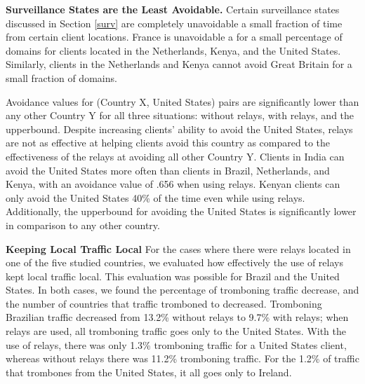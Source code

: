 {\bf Surveillance States are the Least Avoidable.}
Certain surveillance states discussed in Section \ref{surv} are completely unavoidable a small fraction of time from certain client locations.  France is unavoidable a for a small percentage of domains for clients located in the Netherlands, Kenya, and the United States.  Similarly, clients in the Netherlands and Kenya cannot avoid Great Britain for a small fraction of domains.  

Avoidance values for (Country X, United States) pairs are significantly lower than any other Country Y for all three situations: without relays, with relays, and the upperbound.   Despite increasing clients' ability to avoid the United States, relays are not as effective at helping clients avoid this country as compared to the effectiveness of the relays at avoiding all other Country Y.  Clients in India can avoid the United States more often than clients in Brazil, Netherlands, and Kenya, with an avoidance value of .656 when using relays.  Kenyan clients can only avoid the United States 40\% of the time even while using relays.  Additionally, the upperbound for avoiding the United States is significantly lower in comparison to any other country.  

{\bf Keeping Local Traffic Local}
For the cases where there were relays located in one of the five studied countries, we evaluated how effectively the use of relays kept local traffic local.  This evaluation was possible for Brazil and the United States.  In both cases, we found the percentage of tromboning traffic decrease, and the number of countries that traffic tromboned to decreased.  Tromboning Brazilian traffic decreased from 13.2\% without relays to 9.7\% with relays; when relays are used, all tromboning traffic goes only to the United States.  With the use of relays, there was only 1.3\% tromboning traffic for a United States client, whereas without relays there was 11.2\% tromboning traffic.  For the 1.2\% of traffic that trombones from the United States, it all goes only to Ireland.
